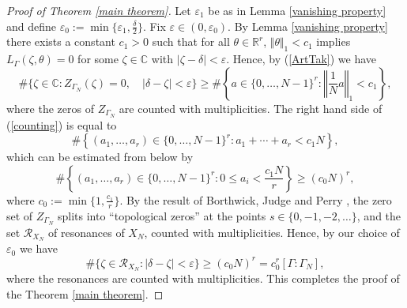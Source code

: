 \documentclass[12pt]{article}
\newcommand{\CC}{\mathbb{C}}
\begin{document}
\begin{proof}[Proof of Theorem \ref{main theorem}]

Let $ \varepsilon_{1} $ be as in Lemma \ref{vanishing property} and define $ \varepsilon_{0}:= \min\{ \varepsilon_{1}, \frac{\delta}{2} \} $. Fix $ \varepsilon\in (0, \varepsilon_{0}) $. By Lemma \ref{vanishing property} there exists a constant $ c_{1} > 0 $ such that for all $ \theta \in \mathbb{R}^{r} $, $ \Vert \theta\Vert_{1} < c_{1} $ implies $ L_{\Gamma}(\zeta,\theta) = 0 $ for some $ \zeta\in \CC $ with $ \vert \zeta-\delta\vert < \varepsilon $. Hence, by (\ref{ArtTak}) we have
\begin{equation}\label{counting}
\# \{ \zeta\in \CC : Z_{\Gamma_{N}}(\zeta)=0,\quad \vert \delta-\zeta\vert < \varepsilon\} \geq \# \left\{ a\in \{ 0, \dots, N-1\}^{r}  : \left\Vert \frac{1}{N}a \right\Vert_{1} < c_{1} \right\},
\end{equation}
where the zeros of $ Z_{\Gamma_{N}} $ are counted with multiplicities.
The right hand side of (\ref{counting}) is equal to 
$$ \#\left\{ (a_{1},\dots, a_{r})\in \{ 0, \dots, N-1 \}^{r} : a_{1}+\cdots +a_{r} < c_{1}N \right\}, $$
which can be estimated from below by 
$$ \#\left\{ (a_{1},\dots, a_{r})\in \{ 0, \dots, N-1 \}^{r} : 0\leq a_{i}< \frac{c_{1}N}{r} \right\} \geq (c_{0}N)^{r}, $$ 
where $ c_{0}:= \min\{1, \frac{c_{1}}{r} \} $. 
By the result of Borthwick, Judge and Perry \cite{BJP}, the zero set of $ Z_{\Gamma_{N}} $ splits into ``topological zeros'' at the points $ s\in \{ 0, -1, -2, \dots\} $, and the set $ \mathcal{R}_{X_{N}} $ of resonances of $ X_{N} $, counted with multiplicities. Hence, by our choice of $ \varepsilon_{0} $ we have 
\begin{equation}
\# \{ \zeta\in \mathcal{R}_{X_{N}} : \vert \delta-\zeta\vert < \varepsilon\} \geq \left( c_{0}N\right)^{r} = c_{0}^{r}[\Gamma : \Gamma_{N}],
\end{equation}
where the resonances are counted with multiplicities. This completes the proof of the Theorem \ref{main theorem}.
\end{proof}



\end{document}

